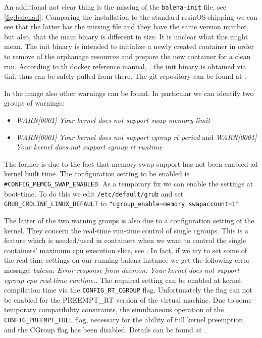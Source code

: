 \documentclass[]{scrartcl}
\begin{document}
An additional not clear thing is the missing of the \texttt{balena-init} file, see \ref{fig:balenad}. Comparing the installation to the standard resinOS shipping we can see that the latter has the missing file and they have the same version number, but also, that the main binary is different in size. It is unclear what this might mean. The init binary is intended to initialize a newly created container in order to remove al the orphanage resources and prepare the new container for a clean run. According to th docker reference manual, \cite{docker03}, the init binary is obtained via tini, thus can be safely pulled from there. The git repository can be found at \cite{tini01}.

In the image also other warnings can be found. In particular we can identify two groups of warnings:

\begin{itemize}
	\item \textit{WARN[0001] Your kernel does not support swap memory limit}

	\item \textit{WARN[0001] Your kernel does not support cgroup rt period} and \textit{WARN[0001] Your kernel does not support cgroup rt runtime} 
\end{itemize}

The former is due to the fact that memory swap support has not been enabled ad kernel built time. 
The configuration setting to be enabled is \texttt{\#CONFIG\_MEMCG\_SWAP\_ENABLED}. As a temporary fix we can enable the settings at boot-time. 
To do this we edit \texttt{/etc/default/grub} and set 
\texttt{GRUB\_CMDLINE\_LINUX\_DEFAULT} to \texttt{"cgroup\_enable=memory swapaccount=1"}

The latter of the two warning groups is also due to a configuration setting of the kernel. They concern the real-time run-time control of single cgroups. This is a feature which is needed/used in containers when we want to control the single containers' maximum cpu execution slice, see \cite{docker04}. 
In fact, if we try to set some of the real-time settings on our running balena instance we get the following error message: \textit{balena: Error response from daemon: Your kernel does not support cgroup cpu real-time runtime.}.
The required setting can be enabled at kernel compilation time via the \texttt{CONFIG\_RT\_CGROUP} flag. 
Unfortunately the flag can not be enabled for the PREEMPT\_RT version of the virtual machine. Due to some temporary compatibility constraints, the simultaneous operation of the \texttt{CONFIG\_PREEMPT\_FULL} flag, necessary for the ability of full kernel preemption, and the CGroup flag has been disabled. Details can be found at \cite{lfnd01}.
\end{document}
